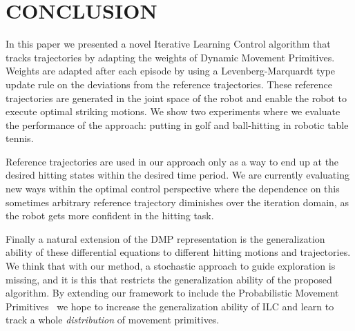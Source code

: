 \section{CONCLUSION}\label{conclusion}

In this paper we presented a novel Iterative Learning Control algorithm that tracks trajectories by adapting the weights of Dynamic Movement Primitives. Weights are adapted after each episode by using a Levenberg-Marquardt type update rule on the deviations from the reference trajectories. These reference trajectories are generated in the joint space of the robot and enable the robot to execute optimal striking motions. We show two experiments where we evaluate the performance of the approach: putting in golf and ball-hitting in robotic table tennis. 

Reference trajectories are used in our approach only as a way to end up at the desired hitting states within the desired time period. We are currently evaluating new ways within the optimal control perspective where the dependence on this sometimes arbitrary reference trajectory diminishes over the iteration domain, as the robot gets more confident in the hitting task.

Finally a natural extension of the DMP representation is the generalization ability of these differential equations to different hitting motions and trajectories. We think that with our method, a stochastic approach to guide exploration is missing, and it is this that restricts the generalization ability of the proposed algorithm. By extending our framework to include the Probabilistic Movement Primitives~\cite{Paraschos13} we hope to increase the generalization ability of ILC and learn to track a whole \emph{distribution} of movement primitives.

%
%
%

